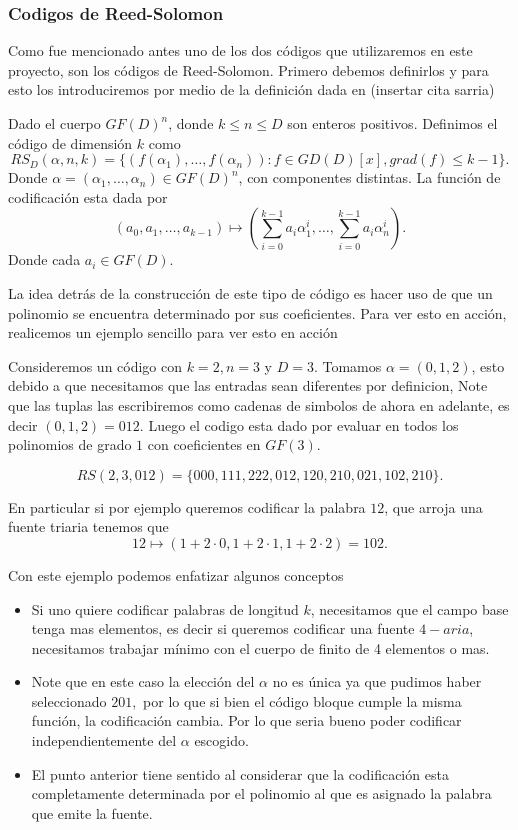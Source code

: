 
\subsubsection{Codigos de Reed-Solomon}
Como fue mencionado antes uno de los dos códigos que utilizaremos en este proyecto, son los códigos de Reed-Solomon. Primero debemos definirlos y para esto los introduciremos por medio de la definición dada en (insertar cita sarria)
\begin{definition}
Dado el cuerpo $GF(D)^n$, donde $k\leq n\leq D$ son enteros positivos. Definimos el código de dimensión $k$ como 
$$RS_D(\alpha,n,k)=\{(f(\alpha_1),\ldots ,f(\alpha_n)):f\in GD(D)[x], grad(f)\leq k-1\}.$$ 
Donde $\alpha=(\alpha_1,\ldots,\alpha_n)\in GF(D)^n$, con componentes distintas. La función de codificación esta dada por
$$(a_0,a_1,\ldots,a_{k-1})\mapsto \left(\sum_{i=0}^{k-1}a_i\alpha_1^{i},\ldots,\sum_{i=0}^{k-1}a_i\alpha_n^{i}\right).$$
Donde cada $a_i\in GF(D).$
\end{definition}
La idea detrás de la construcción de este tipo de código es hacer uso de que un polinomio se encuentra determinado por sus coeficientes. Para ver esto en acción, realicemos un ejemplo sencillo para ver esto en acción
\begin{eg}
     Consideremos un código con $k=2,n=3$ y $D=3.$ Tomamos $\alpha=(0,1,2)$, esto debido a que necesitamos que las entradas sean diferentes por definicion, Note que las tuplas las escribiremos como cadenas de simbolos de ahora en adelante, es decir $(0,1,2)=012$. Luego el codigo esta dado por evaluar en todos los polinomios de grado $1$ con coeficientes en $GF(3).$

     $$RS(2,3,012)=\{000,111,222,012,120,210,021,102,210\}.$$

     En particular si por ejemplo queremos codificar la palabra $12$, que arroja una fuente triaria tenemos que
     $$12\mapsto (1+2\cdot0,1+2\cdot1,1+2\cdot2)=102.$$ 
 \end{eg} 

 Con este ejemplo  podemos enfatizar algunos conceptos
     \begin{itemize}
         \item Si uno quiere codificar palabras de longitud $k$, necesitamos que el campo base tenga mas elementos, es decir si queremos codificar una fuente $4-aria$, necesitamos trabajar mínimo con el cuerpo de finito de 4 elementos o mas.
         \item Note que en este caso la elección del $\alpha$ no es única ya que pudimos haber seleccionado $201,$ por lo que si bien el código bloque cumple la misma función, la codificación cambia. Por lo que seria bueno poder codificar independientemente del $\alpha$ escogido.
         \item  El punto anterior tiene sentido al considerar que la codificación esta completamente determinada por el polinomio al que es asignado la palabra que emite la fuente. 
         
     \end{itemize}

